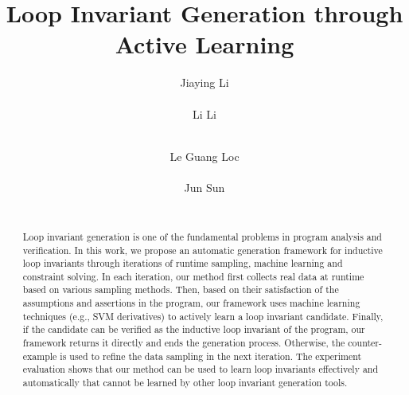 \documentclass{sig-alternate-05-2015}
\begin{document}
    

\title{Loop Invariant Generation through Active Learning}

\author{
%
%
\alignauthor
Jiaying Li\\
       \\
\alignauthor
Li Li\\
       \\
\and  %
\alignauthor 
Le Guang Loc\\
       \\
\alignauthor 
Jun Sun\\
       \\
}

\maketitle

\begin{abstract}
	Loop invariant generation is one of the fundamental problems in program analysis and verification. 
    In this work, we propose an automatic generation framework for inductive loop invariants 
    through iterations of runtime sampling, machine learning and constraint solving. 
    In each iteration, our method first collects real data at runtime based on various sampling methods. 
    Then, based on their satisfaction of the assumptions and assertions in the program, 
    our framework uses machine learning techniques (e.g., SVM derivatives) 
    to actively learn a loop invariant candidate. 
    Finally, if the candidate can be verified as the inductive loop invariant of the program, 
    our framework returns it directly and ends the generation process. 
    Otherwise, the counter-example is used to refine the data sampling in the next iteration. 
    The experiment evaluation shows that our method can be used to learn loop invariants 
    effectively and automatically that cannot be learned by other loop invariant generation tools. 
\end{abstract}


% 









\end{document}
